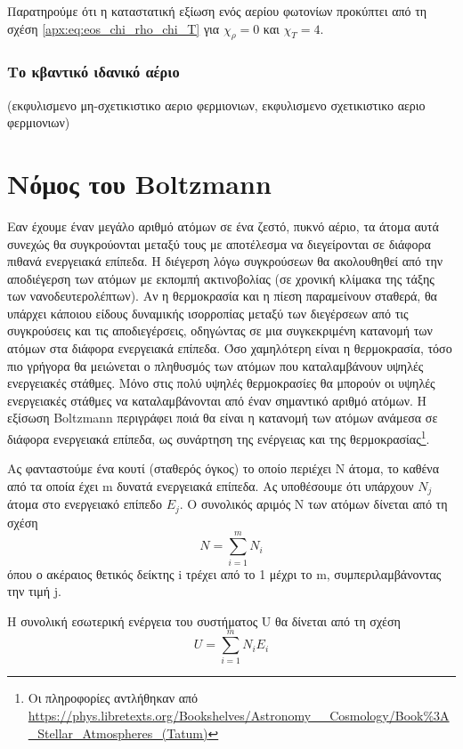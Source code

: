Παρατηρούμε ότι η καταστατική εξίωση ενός αερίου φωτονίων προκύπτει από τη σχέση \eqref{apx:eq:eos_chi_rho_chi_T} για $\chi_\rho = 0$ και $\chi_T = 4$.



\subsubsection{Το κβαντικό ιδανικό αέριο}
(εκφυλισμενο μη-σχετικιστικο αεριο φερμιονιων, εκφυλισμενο σχετικιστικο αεριο φερμιονιων)





\section{Νόμος του Boltzmann}
Εαν έχουμε έναν μεγάλο αριθμό ατόμων σε ένα ζεστό, πυκνό αέριο, τα άτομα αυτά συνεχώς θα συγκρούονται μεταξύ τους με αποτέλεσμα να διεγείρονται σε διάφορα πιθανά ενεργειακά επίπεδα. Η διέγερση λόγω συγκρούσεων θα ακολουθηθεί από την αποδιέγερση των ατόμων με εκπομπή ακτινοβολίας (σε χρονική κλίμακα της τάξης των νανοδευτερολέπτων). Αν η θερμοκρασία και η πίεση παραμείνουν σταθερά, θα υπάρχει κάποιου είδους δυναμικής ισορροπίας μεταξύ των διεγέρσεων από τις συγκρούσεις και τις αποδιεγέρσεις, οδηγώντας σε μια συγκεκριμένη κατανομή των ατόμων στα διάφορα ενεργειακά επίπεδα. Όσο χαμηλότερη είναι η θερμοκρασία, τόσο πιο γρήγορα θα μειώνεται ο πληθυσμός των ατόμων που καταλαμβάνουν υψηλές ενεργειακές στάθμες. Μόνο στις πολύ υψηλές θερμοκρασίες θα μπορούν οι υψηλές ενεργειακές στάθμες να καταλαμβάνονται από έναν σημαντικό αριθμό ατόμων. Η εξίσωση Boltzmann περιγράφει ποιά θα είναι η κατανομή των ατόμων ανάμεσα σε διάφορα ενεργειακά επίπεδα, ως συνάρτηση της ενέργειας και της θερμοκρασίας\footnote{Οι πληροφορίες αντλήθηκαν από \url{https://phys.libretexts.org/Bookshelves/Astronomy__Cosmology/Book\%3A_Stellar_Atmospheres_(Tatum)}}. 

Ας φανταστούμε ένα κουτί (σταθερός όγκος) το οποίο περιέχει N άτομα, το καθένα από τα οποία έχει m δυνατά ενεργειακά επίπεδα. Ας υποθέσουμε ότι υπάρχουν $ N_j$ άτομα στο ενεργειακό επίπεδο $ E_j$. Ο συνολικός αριμός N των ατόμων δίνεται από τη σχέση
\begin{equation}
    \label{eq:apx:total_number_of_atoms}
     N = \sum_{i=1}^{m} N_i
\end{equation}
όπου ο ακέραιος θετικός δείκτης i τρέχει από το 1 μέχρι το m, συμπεριλαμβάνοντας την τιμή j.

Η συνολική εσωτερική ενέργεια του συστήματος U θα δίνεται από τη σχέση
\begin{equation}
    \label{eq:apx:internal_energy}
     U = \sum_{i=1}^{m} N_i E_i
\end{equation}

